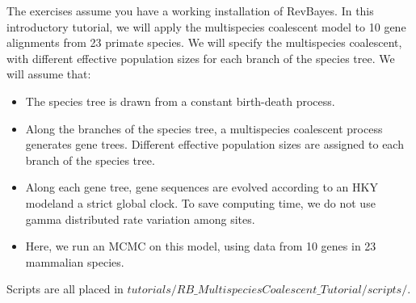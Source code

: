 \vspace{20mm}

{\begin{framed}
\begin{center}
The exercises assume you have a working installation of RevBayes.
In this introductory tutorial, we will apply the multispecies coalescent model to 10 gene alignments from 23 primate species.
We will specify the multispecies coalescent, with different effective population sizes for each branch of the species tree.
We will assume that:
\begin{itemize}
\item The species tree is drawn from a constant birth-death process.
\item Along the branches of the species tree, a multispecies coalescent process generates gene trees. Different effective population sizes are assigned to each branch of the species tree.
\item Along each gene tree, gene sequences are evolved according to an HKY modeland a strict global clock. To save computing time, we do not use gamma distributed rate variation among sites.
\item Here, we run an MCMC on this model, using data from 10 genes in 23 mammalian species.
\end{itemize}
Scripts are all placed in {\footnotesize \emph{$tutorials/RB\_MultispeciesCoalescent\_Tutorial/scripts/$}}. 
\end{center}
\end{framed}}
\vspace{5mm}

